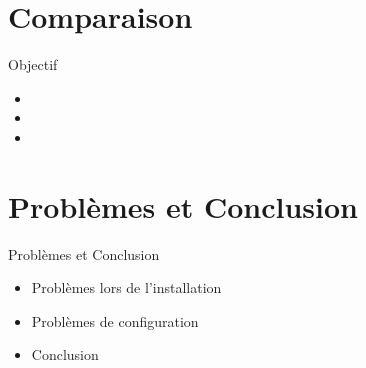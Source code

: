 \documentclass[t,12pt]{beamer}
\begin{document}
\section{Comparaison}                                                    %
\begin{frame}                                                         %
    \begin{center}{\textcolor{grisbleu}{\Large Objectif}}\end{center} %
    \begin{itemize}                                                   %
	\item
	\item
	\item
\end{itemize}
\end{frame}                                                            %


\section{Problèmes et Conclusion}                                                    %
\begin{frame}                                                         %
    \begin{center}{\textcolor{grisbleu}{\Large Problèmes et Conclusion}}\end{center} %
    \begin{itemize}                                                   %
	\item Problèmes lors de l'installation
	\item Problèmes de configuration
	\item Conclusion
\end{itemize}
\end{frame}                                                            %
\end{document}
